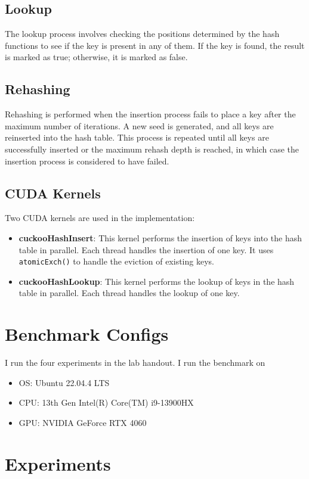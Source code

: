 \documentclass{article}
\begin{document}
\subsection{Lookup}
The lookup process involves checking the positions determined by the hash functions to see if the key is present in any of them. If the key is found, the result is marked as true; otherwise, it is marked as false.

\subsection{Rehashing}
Rehashing is performed when the insertion process fails to place a key after the maximum number of iterations. A new seed is generated, and all keys are reinserted into the hash table. This process is repeated until all keys are successfully inserted or the maximum rehash depth is reached, in which case the insertion process is considered to have failed.

\subsection{CUDA Kernels}
Two CUDA kernels are used in the implementation:
\begin{itemize}
    \item \textbf{cuckooHashInsert}: This kernel performs the insertion of keys into the hash table in parallel. Each thread handles the insertion of one key. It uses \verb|atomicExch()| to handle the eviction of existing keys.
    \item \textbf{cuckooHashLookup}: This kernel performs the lookup of keys in the hash table in parallel. Each thread handles the lookup of one key.
\end{itemize}

\section{Benchmark Configs}

I run the four experiments in the lab handout.
I run the benchmark on 
\begin{itemize}
    \item OS: Ubuntu 22.04.4 LTS
    \item CPU: 13th Gen Intel(R) Core(TM) i9-13900HX
    \item GPU: NVIDIA GeForce RTX 4060
\end{itemize}

\section{Experiments}
\end{document}
